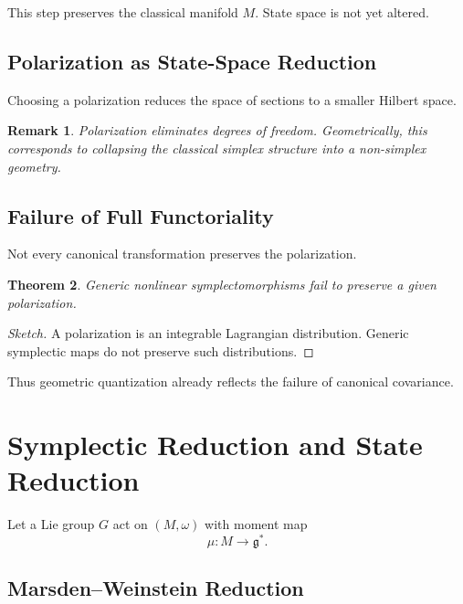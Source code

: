 \documentclass[11pt]{article}
\newtheorem{theorem}{Theorem}[section]
\newtheorem{remark}[theorem]{Remark}
\begin{document}
This step preserves the classical manifold $M$.
State space is not yet altered.

\subsection{Polarization as State-Space Reduction}

Choosing a polarization reduces the space of sections
to a smaller Hilbert space.

\begin{remark}
Polarization eliminates degrees of freedom.
Geometrically, this corresponds to collapsing
the classical simplex structure into a non-simplex geometry.
\end{remark}

\subsection{Failure of Full Functoriality}

Not every canonical transformation preserves the polarization.

\begin{theorem}
Generic nonlinear symplectomorphisms fail
to preserve a given polarization.
\end{theorem}

\begin{proof}[Sketch]
A polarization is an integrable Lagrangian distribution.
Generic symplectic maps do not preserve such distributions.
\end{proof}

Thus geometric quantization already reflects
the failure of canonical covariance.

\section{Symplectic Reduction and State Reduction}

Let a Lie group $G$ act on $(M,\omega)$
with moment map
\[
\mu : M \to \mathfrak{g}^*.
\]

\subsection{Marsden--Weinstein Reduction}
\end{document}
